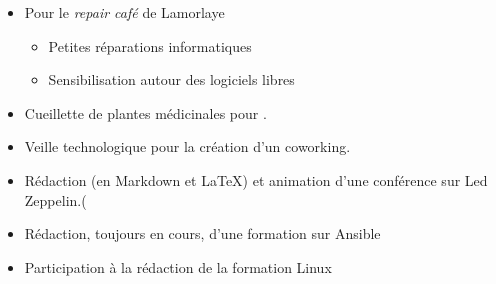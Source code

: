 {\begin{itemize}
\begin{itemize}
            \item{Animation des débats post-projection.}
        \end{itemize}
        \item{Pour le \textit{repair café}  de Lamorlaye}
        \begin{itemize}
            \item{Petites réparations informatiques}
            \item{Sensibilisation autour des logiciels libres}
        \end{itemize}
        \item{Cueillette de plantes médicinales pour .}
        \item{Veille technologique pour la création d'un coworking.}
        \item{Rédaction (en Markdown et \LaTeX) et animation d'une conférence sur Led Zeppelin.(}
        \item{Rédaction, toujours en cours, d'une formation sur Ansible}
        \item{Participation à la rédaction de la formation Linux }
    \end{itemize}
}

